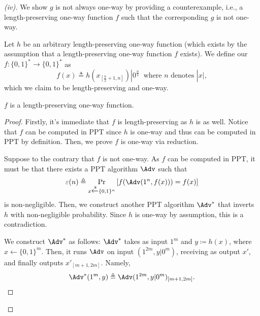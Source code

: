 \begin{proof}[(iv)]
    We show $g$ is not always one-way by providing a counterexample, i.e., a length-preserving one-way function $f$ such that the corresponding $g$ is not one-way.
    
    Let $h$ be an arbitrary length-preserving one-way function (which exists by the assumption that a length-preserving one-way function $f$ exists). We define our $f:\{0,1\}^\ast\to \{0,1\}^\ast$ as
    \[
    f(x)\triangleq h(x_{[\frac{n}{2}+1, n]})|0^{\frac{n}{2}}
    \;\; \text{where } n \text{ denotes } |x|,
    \]
    which we claim to be length-preserving and one-way.
    \newpage
    \begin{claim}\label{clm:iv-1}
        $f$ is a length-preserving one-way function.
    \end{claim}
    \begin{proof}
        Firstly, it's immediate that $f$ is length-preserving as $h$ is as well. Notice that $f$ can be computed in PPT since $h$ is one-way and thus can be computed in PPT by definition. Then, we prove $f$ is one-way via reduction.

        Suppose to the contrary that $f$ is not one-way. As $f$ can be computed in PPT, it must be that there exists a PPT algorithm $\Adv$ such that
        \[
        \varepsilon(n)\triangleq \Pr_{x\xleftarrow{\$}\{0,1\}^n}\left[f(\Adv(1^n, f(x))) = f(x)\right]
        \]
        is non-negligible. Then, we construct another PPT algorithm $\Adv^\ast$ that inverts $h$ with non-negligible probability. Since $h$ is one-way by assumption, this is a contradiction.
    
        We construct $\Adv^\ast$ as follows: $\Adv^\ast$ takes as input $1^{m}$ and $y\coloneq h(x)$, where $x\xleftarrow{}\{0,1\}^m$. Then, it runs $\Adv$ on input $(1^{2m}, y|0^m)$, receiving as output $x'$, and finally outputs $x'_{[m+1, 2m]}$. Namely,
        \[
        \Adv^\ast(1^{m}, y) \triangleq \Adv(1^{2m}, y|0^m)_{[m+1,2m]}.
        \]
    

\end{proof}
\end{proof}
